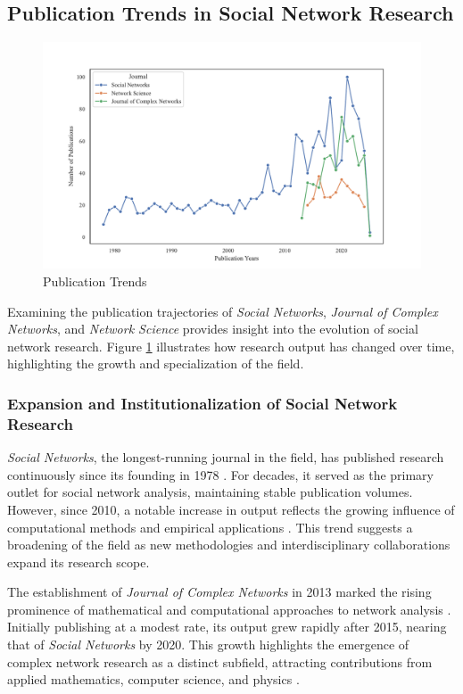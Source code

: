 \documentclass[twocolumn]{article}
\begin{document}
	\subsection{Publication Trends in Social Network Research}
	
	\begin{figure}[htbp]
		\centering
		\caption{Publication Trends}\label{fig.fig1}
		\includegraphics[width=\columnwidth]{images/Record Count Proportion.pdf}
	\end{figure}
	
	Examining the publication trajectories of \textit{Social Networks}, \textit{Journal of Complex Networks}, and \textit{Network Science} provides insight into the evolution of social network research. Figure \ref{fig.fig1} illustrates how research output has changed over time, highlighting the growth and specialization of the field.
	
	\subsubsection*{Expansion and Institutionalization of Social Network Research}
	
	\textit{Social Networks}, the longest-running journal in the field, has published research continuously since its founding in 1978 \cite{Freeman2004}. For decades, it served as the primary outlet for social network analysis, maintaining stable publication volumes. However, since 2010, a notable increase in output reflects the growing influence of computational methods and empirical applications \cite{Borgatti2009}. This trend suggests a broadening of the field as new methodologies and interdisciplinary collaborations expand its research scope.
	
	The establishment of \textit{Journal of Complex Networks} in 2013 marked the rising prominence of mathematical and computational approaches to network analysis \cite{Barabasi2016}. Initially publishing at a modest rate, its output grew rapidly after 2015, nearing that of \textit{Social Networks} by 2020. This growth highlights the emergence of complex network research as a distinct subfield, attracting contributions from applied mathematics, computer science, and physics \cite{Borgatti2009}.
	
\end{document}
